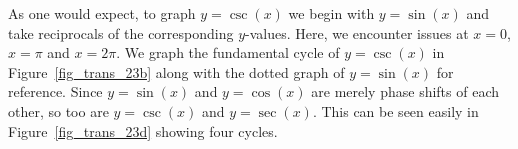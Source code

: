 As one would expect, to graph $y = \csc(x)$ we begin with $y = \sin(x)$ and take reciprocals of the corresponding $y$-values.  Here, we encounter issues at $x = 0$, $x = \pi$ and $x = 2\pi$.  We graph the fundamental cycle of $y = \csc(x)$ in Figure~\ref{fig_trans_23b} along with the dotted graph of $y=\sin(x)$ for reference.  Since $y = \sin(x)$ and $y = \cos(x)$ are merely phase shifts of each other, so too are $y = \csc(x)$ and $y = \sec(x)$. This can be seen easily in Figure~\ref{fig_trans_23d} showing four cycles. 

\begin{figure}
			\centering
\centerline{
\hspace{0.1cm}
}
\centering{}\\

\end{figure}
